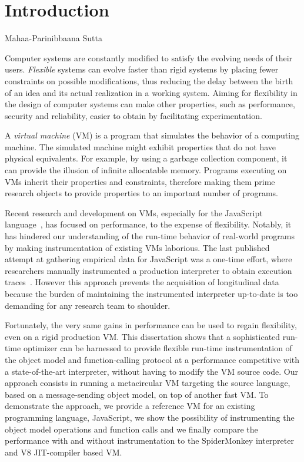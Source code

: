 \chapter{Introduction}

{Mahaa-Parinibbaana Sutta \cite{1988last}}

Computer systems are constantly modified to satisfy the evolving needs of their
users. \textit{Flexible} systems can evolve faster than rigid systems by
placing fewer constraints on possible modifications, thus reducing the delay
between the birth of an idea and its actual realization in a working system.
Aiming for flexibility in the design of computer systems can make other
properties, such as performance, security and reliability, easier to obtain by
facilitating experimentation.

A \textit{virtual machine} (VM) is a program that simulates the behavior of a
computing machine.  The simulated machine might exhibit properties that do not
have physical equivalents. For example, by using a garbage collection
component, it can provide the illusion of infinite allocatable memory. Programs
executing on VMs inherit their properties and constraints, therefore making
them prime research objects to provide properties to an important number of
programs.

Recent research and development on VMs, especially for the JavaScript
language~\cite{js_spec}, has focused on performance, to the expense of
flexibility. Notably, it has hindered our understanding of the run-time
behavior of real-world programs by making instrumentation of existing VMs
laborious. The last published attempt at gathering empirical data for
JavaScript was a one-time effort, where researchers manually instrumented a
production interpreter to obtain execution traces~\cite{behavior_js}. However
this approach prevents the acquisition of longitudinal data because the burden
of maintaining the instrumented interpreter up-to-date is too demanding for any
research team to shoulder.

Fortunately, the very same gains in performance can be used to regain
flexibility, even on a rigid production VM. This dissertation shows that a
sophisticated run-time optimizer can be harnessed to provide flexible run-time
instrumentation of the object model and function-calling protocol at a
performance competitive with a state-of-the-art interpreter, without having to
modify the VM source code. Our approach consists in running a metacircular VM
targeting the source language, based on a message-sending object model, on top
of another fast VM. To demonstrate the approach, we provide a reference VM for
an existing programming language, JavaScript, we show the possibility of
instrumenting the object model operations and function calls and we finally
compare the performance with and without instrumentation to the SpiderMonkey
interpreter and V8 JIT-compiler based VM. 

